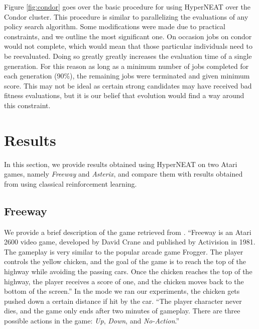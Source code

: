 \documentclass{article}
\begin{document}
Figure \ref{fig:condor} goes over the basic procedure for using HyperNEAT over the Condor cluster. This procedure is similar to parallelizing the evaluations of any policy search algorithm. Some modifications were made due to practical constraints, and we outline the most significant one. On occasion jobs on condor would not complete, which would mean that those particular individuals need to be reevaluated. Doing so greatly greatly increases the evaluation time of a single generation. For this reason as long as a minimum number of jobs completed for each generation (90\%), the remaining jobs were terminated and given minimum score. This may not be ideal as certain strong candidates may have received bad fitness evaluations, but it is our belief that evolution would find a way around this constraint.

\section{Results}

In this section, we provide results obtained using HyperNEAT on two Atari games, namely \textit{Freeway} and \textit{Asterix}, and compare them with results obtained from using classical reinforcement learning.

\subsection {Freeway}
We provide a brief description of the game retrieved from \cite{naddaf10}. ``Freeway is an Atari 2600 video game, developed by David Crane and published by Activision in 1981. The gameplay is very similar to the popular arcade game Frogger. The player controls the yellow chicken, and the goal of the game is to reach the top of the highway while avoiding the passing cars. Once the chicken reaches the top of the highway, the player receives a score of one, and the chicken moves back to the bottom of the screen.'' In the mode we ran our experiments, the chicken gets pushed down a certain distance if hit by the car. ``The player character never dies, and the game only ends after two minutes of gameplay. There are three possible actions in the game: \textit{Up}, \textit{Down}, and \textit{No-Action}.''
\end{document}
